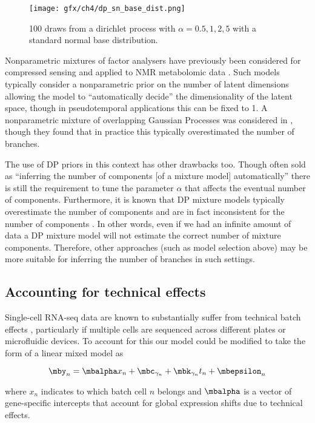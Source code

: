 \begin{figure}
	\centering
	\texttt{[image: gfx/ch4/dp\_sn\_base\_dist.png]}
	\caption{100 draws from a dirichlet process with $\alpha = 0.5, 1, 2, 5$ with a standard normal base distribution.} \label{fig:dp}
\end{figure}

Nonparametric mixtures of factor analysers have previously been considered for compressed sensing \cite{chen2010compressive} and applied to NMR metabolomic data \cite{murphy2017infinite}. Such models typically consider a nonparametric prior on the number of latent dimensions allowing the model to ``automatically decide'' the dimensionality of the latent space, though in pseudotemporal applications this can be fixed to 1. A nonparametric mixture of overlapping Gaussian Processes was considered in \cite{lonnberg2016temporal}, though they found that in practice this typically overestimated the number of branches.

The use of DP priors in this context has other drawbacks too. Though often sold as ``inferring the number of components [of a mixture model] automatically'' there is still the requirement to tune the parameter $\alpha$ that affects the eventual number of components. Furthermore, it is known that DP mixture models typically overestimate the number of components and are in fact inconsistent for the number of components \cite{miller2013simple}. In other words, even if we had an infinite amount of data a DP mixture model will not estimate the correct number of mixture components. Therefore, other approaches (such as model selection above) may be more suitable for inferring the number of branches in such settings.

\subsection{Accounting for technical effects}

Single-cell RNA-seq data are known to substantially suffer from technical batch effects \cite{tung2017batch,hicks2017missing}, particularly if multiple cells are sequenced across different plates or microfluidic devices. To account for this our model could be modified to take the form of a linear mixed model as

\begin{equation}
	\mby_n = \mbalpha x_n + \mbc_{\gamma_n} + \mbk_{\gamma_n} t_n + \mbepsilon_n
\end{equation}

where $x_n$ indicates to which batch cell $n$ belongs and $\mbalpha$ is a vector of gene-specific intercepts that account for global expression shifts due to technical effects.
